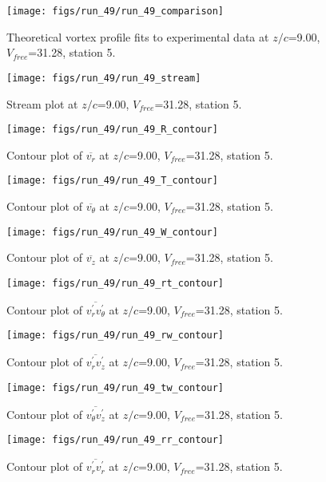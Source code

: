 \begin{figure}[H]
\centering
\texttt{[image: figs/run\_49/run\_49\_comparison]}
\caption{Theoretical vortex profile fits to experimental data at $z/c$=9.00, $V_{free}$=31.28, station 5.}
\end{figure}


\begin{figure}[H]
\centering
\texttt{[image: figs/run\_49/run\_49\_stream]}
\caption{Stream plot at $z/c$=9.00, $V_{free}$=31.28, station 5.}
\end{figure}


\begin{figure}[H]
\centering
\texttt{[image: figs/run\_49/run\_49\_R\_contour]}
\caption{Contour plot of $\overline{v_{r}}$ at $z/c$=9.00, $V_{free}$=31.28, station 5.}
\end{figure}


\begin{figure}[H]
\centering
\texttt{[image: figs/run\_49/run\_49\_T\_contour]}
\caption{Contour plot of $\overline{v_{\theta}}$ at $z/c$=9.00, $V_{free}$=31.28, station 5.}
\end{figure}


\begin{figure}[H]
\centering
\texttt{[image: figs/run\_49/run\_49\_W\_contour]}
\caption{Contour plot of $\overline{v_{z}}$ at $z/c$=9.00, $V_{free}$=31.28, station 5.}
\end{figure}


\begin{figure}[H]
\centering
\texttt{[image: figs/run\_49/run\_49\_rt\_contour]}
\caption{Contour plot of $\overline{v_{r}^{\prime} v_{\theta}^{\prime}}$ at $z/c$=9.00, $V_{free}$=31.28, station 5.}
\end{figure}


\begin{figure}[H]
\centering
\texttt{[image: figs/run\_49/run\_49\_rw\_contour]}
\caption{Contour plot of $\overline{v_{r}^{\prime} v_{z}^{\prime}}$ at $z/c$=9.00, $V_{free}$=31.28, station 5.}
\end{figure}


\begin{figure}[H]
\centering
\texttt{[image: figs/run\_49/run\_49\_tw\_contour]}
\caption{Contour plot of $\overline{v_{\theta}^{\prime} v_{z}^{\prime}}$ at $z/c$=9.00, $V_{free}$=31.28, station 5.}
\end{figure}


\begin{figure}[H]
\centering
\texttt{[image: figs/run\_49/run\_49\_rr\_contour]}
\caption{Contour plot of $\overline{v_{r}^{\prime} v_{r}^{\prime}}$ at $z/c$=9.00, $V_{free}$=31.28, station 5.}
\end{figure}


